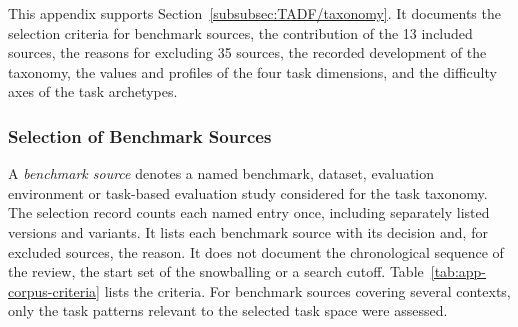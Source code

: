 This appendix supports Section~\ref{subsubsec:TADF/taxonomy}. It documents the selection criteria for benchmark sources, the contribution of the 13 included sources, the reasons for excluding 35 sources, the recorded development of the taxonomy, the values and profiles of the four task dimensions, and the difficulty axes of the task archetypes.

\subsubsection{Selection of Benchmark Sources}
\label{app:taxonomy/corpus}
A \emph{benchmark source} denotes a named benchmark, dataset, evaluation environment or task-based evaluation study considered for the task taxonomy. The selection record counts each named entry once, including separately listed versions and variants. It lists each benchmark source with its decision and, for excluded sources, the reason. It does not document the chronological sequence of the review, the start set of the snowballing or a search cutoff. Table~\ref{tab:app-corpus-criteria} lists the criteria. For benchmark sources covering several contexts, only the task patterns relevant to the selected task space were assessed.

